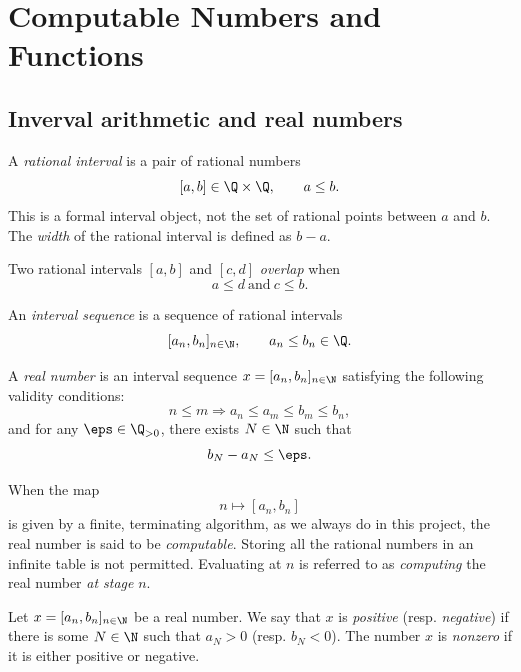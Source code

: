 \chapter{Computable Numbers and Functions}\label{ch:foundations}

\section{Inverval arithmetic and real numbers \humanchecked}

\begin{definition}\label{def:qinterval}
A \emph{rational interval} is a pair of rational numbers
\[
  [a,b]\in\Q\times\Q,\qquad a\le b.
\]
This is a formal interval object, not the set of rational points between
\(a\) and \(b\).  The \emph{width} of the rational interval is defined as \(b-a\).

Two rational intervals \([a, b]\) and \([c, d]\) \emph{overlap} when
\[
  a\le d\ \text{and}\ c\le b.
\]
\end{definition}

\begin{definition}\label{def:interval-sequence}
An \emph{interval sequence} is a sequence of rational intervals
\[
  [a_n,b_n]_{n\in\N},
  \qquad a_n \leq b_n\in\Q.
\]
\end{definition}

\begin{definition}\label{def:raw-real}
A \emph{real number} is an interval sequence \(x=[a_n,b_n]_{n\in\N}\) satisfying the
following validity conditions:
\[
  n\le m\Rightarrow
  a_n\le a_m\le b_m\le b_n,
\]
and for any $\eps\in\Q_{>0}$, there exists $N\in\N$ such that
\[
  b_N-a_N \le \eps.
\]
\end{definition}

\begin{remark}\label{rem:computable-presentations}
When the map 
\[
  n\mapsto [a_n,b_n]
\]
is given by a finite, terminating algorithm, as we always do in this project,
the real number is said to be \emph{computable}. Storing all the rational numbers
in an infinite table is not permitted. Evaluating at \(n\) is referred to as
\emph{computing} the real number \emph{at stage} \(n\).
\end{remark}

\begin{definition}\label{def:raw-real-sign}
Let \(x=[a_n,b_n]_{n\in\N}\) be a real number.  We say that \(x\) is
\emph{positive} (resp. \emph{negative}) if there is some \(N\in\N\) such that
\( a_N > 0\) (resp. \( b_N<0 \)).
The number \(x\) is \emph{nonzero} if it is either positive or negative.
\end{definition}

